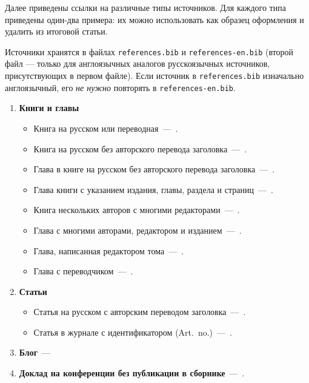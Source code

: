 \documentclass[eqsecnum,authorsinfo]{kioj6}
\begin{document}
    Далее приведены ссылки на различные типы источников. Для каждого типа приведены один-два примера: их можно использовать как образец
    оформления и удалить из итоговой статьи.

    Источники хранятся в файлах
    \texttt{references.bib} и \texttt{references-en.bib} (второй файл --- только для англоязычных аналогов русскоязычных источников, присутствующих в первом файле).
    Если источник в \texttt{references.bib} изначально англоязычный, его \textit{не нужно} повторять в \texttt{references-en.bib}.
    
    \begin{enumerate}
        \item \textbf{Книги и главы} 
        \begin{itemize}[nosep]
            \item Книга на русском или переводная~---~\cite{Hairer}.
            \item Книга на русском без авторского перевода заголовка~---~\cite{Gubanov}.
            \item Глава в книге на русском без авторского перевода заголовка~---~\cite{layexpl7}.
            \item Глава книги с указанием издания, главы, раздела и страниц~---~\cite{ogura}.
            \item Книга нескольких авторов с многими редакторами~---~\cite{HastieTibshiraniFriedman2009}.
            \item Глава с многими авторами, редактором и изданием~---~\cite{Alberts2014CellCycle}.
            \item Глава, написанная редактором тома~---~\cite{Gowers2008LanguageGrammar}.
            \item Глава с переводчиком~---~\cite{Aleksandrov1963GeneralView}.
        \end{itemize}

        \item \textbf{Статьи}
        \begin{itemize}[nosep]
            \item Статья на русском с авторским переводом заголовка~---~\cite{Matveenko}.
            \item Статья в журнале с идентификатором (Art.~no.)~---~\cite{Abbott2016GW150914}.
        \end{itemize}

        \item \textbf{Блог}~---~\cite{Dmitry2024Python}

        \item \textbf{Доклад на конференции без публикации в сборнике}~---~\cite{Caratelli}.


\end{enumerate}
\end{document}
